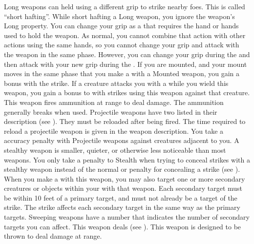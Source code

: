         Long weapons can held using a different grip to strike nearby foes.
        This is called ``short hafting''.
        While short hafting a Long weapon, you ignore the weapon's Long property.
        You can change your grip as a  that requires the hand or hands used to hold the weapon.
        As normal, you cannot combine that action with other actions using the same hands, so you cannot change your grip and attack with the weapon in the same phase.
        However, you can change your grip during the  and then attack with your new grip during the .
        \label{Mounted Weapon} If you are mounted, and your mount moves in the same phase that you make a  with a Mounted weapon, you gain a   bonus with the strike.
         If a creature attacks you with a  while you wield this weapon, you  gain a  bonus to  with strikes using this weapon against that creature.
         This weapon fires ammunition at range to deal damage.
        The ammunition generally breaks when used.
        Projectile weapons have two  listed in their description (see ).
        They must be reloaded after being fired.
        The time required to reload a projectile weapon is given in the weapon description.
        You take a  accuracy penalty with Projectile weapons against creatures adjacent to you.
        A stealthy weapon is smaller, quieter, or otherwise less noticeable than most weapons.
        You only take a  penalty to Stealth when trying to conceal strikes with a stealthy weapon instead of the normal  or  penalty for concealing a strike (see ).
        \label{Sweeping} When you make a   with this weapon, you may also target one or more secondary creatures or objects within your  with that weapon.
        Each secondary target must be within 10 feet of a primary target, and must not already be a target of the strike.
        The strike affects each secondary target in the same way as the primary targets.
        Sweeping weapons have a number that indicates the number of secondary targets you can affect.
         This weapon deals  (see ).
         This weapon is designed to be thrown to deal damage at range.
